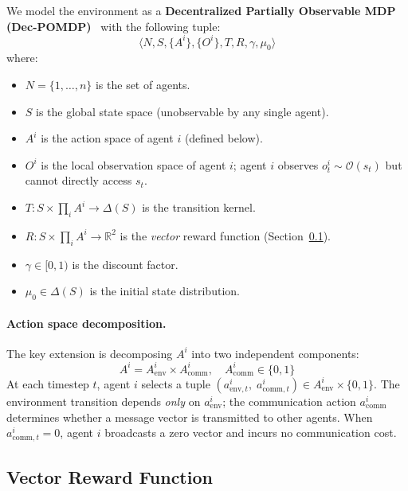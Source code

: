 \documentclass[runningheads]{llncs}
\newcommand{\R}{\mathbb{R}}
\begin{document}
We model the environment as a \textbf{Decentralized Partially Observable
MDP (Dec-POMDP)}~\cite{bernstein2002complexity} with the following tuple:
\begin{equation}
  \langle N, S, \{A^i\}, \{O^i\}, T, R, \gamma, \mu_0 \rangle
  \label{eq:decpomdp}
\end{equation}
where:
\begin{itemize}
  \item $N = \{1, \ldots, n\}$ is the set of agents.
  \item $S$ is the global state space (unobservable by any single agent).
  \item $A^i$ is the action space of agent $i$ (defined below).
  \item $O^i$ is the local observation space of agent $i$; agent $i$
    observes $o^i_t \sim \mathcal{O}(s_t)$ but cannot directly access $s_t$.
  \item $T: S \times \prod_i A^i \to \Delta(S)$ is the transition kernel.
  \item $R: S \times \prod_i A^i \to \R^2$ is the \emph{vector} reward
    function (Section~\ref{sec:reward}).
  \item $\gamma \in [0,1)$ is the discount factor.
  \item $\mu_0 \in \Delta(S)$ is the initial state distribution.
\end{itemize}

\paragraph{Action space decomposition.}
The key extension is decomposing $A^i$ into two independent components:
\begin{equation}
  A^i = A^i_\text{env} \times A^i_\text{comm},
  \quad A^i_\text{comm} \in \{0, 1\}
  \label{eq:action_decomp}
\end{equation}
At each timestep $t$, agent $i$ selects a tuple
$(a^i_{\text{env},t},\; a^i_{\text{comm},t}) \in A^i_\text{env} \times \{0,1\}$.
The environment transition depends \emph{only} on $a^i_\text{env}$;
the communication action $a^i_\text{comm}$ determines whether a message
vector is transmitted to other agents.
When $a^i_{\text{comm},t} = 0$, agent $i$ broadcasts a zero vector and
incurs no communication cost.

\subsection{Vector Reward Function}
\label{sec:reward}
\end{document}
